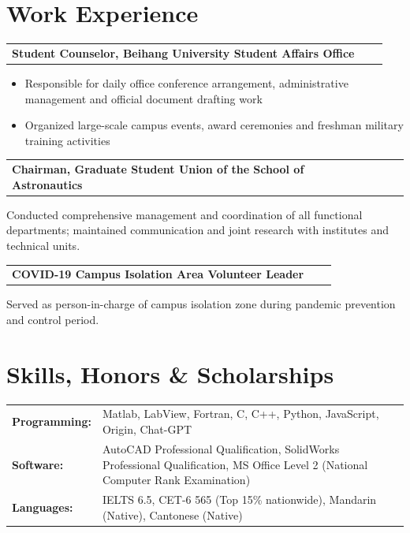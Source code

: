 \documentclass[a4paper,12pt]{article}
\makeatletter
\newenvironment{jobshort}[2]
    {
    \begin{tabularx}{\linewidth}{@{}l X r@{}}
    \textbf{#1} & \hfill &  #2 \\[3.75pt]
    \end{tabularx}
    }
    {
    }
\newenvironment{joblong}[2]
    {
    \begin{tabularx}{\linewidth}{@{}l X r@{}}
    \textbf{#1} & \hfill &  #2 \\[3.75pt]
    \end{tabularx}
    \begin{minipage}[t]{\linewidth}
    \begin{itemize}[nosep,after=\strut, leftmargin=1em, itemsep=3pt,label=--]
    }
    {
    \end{itemize}
    \end{minipage}    
    }
\makeatother
\begin{document}











\section{\textbf{Work Experience}}

\begin{joblong}{Student Counselor, Beihang University Student Affairs Office}{}
\item Responsible for daily office conference arrangement, administrative management and official document drafting work
\item Organized large-scale campus events, award ceremonies and freshman military training activities
\end{joblong}

\begin{jobshort}{Chairman, Graduate Student Union of the School of Astronautics}{}
Conducted comprehensive management and coordination of all functional departments; maintained communication and joint research with institutes and technical units.
\end{jobshort}

\begin{jobshort}{COVID-19 Campus Isolation Area Volunteer Leader}{}
Served as person-in-charge of campus isolation zone during pandemic prevention and control period.
\end{jobshort}


\section{\textbf{Skills, Honors \& Scholarships}}
\begin{tabularx}{\linewidth}{@{}l X@{}}
\textbf{Programming:} & Matlab, LabView, Fortran, C, C++, Python, JavaScript, Origin, Chat-GPT \\
\textbf{Software:} & AutoCAD Professional Qualification, SolidWorks Professional Qualification, MS Office Level 2 (National Computer Rank Examination)\\
\textbf{Languages:} & IELTS 6.5, CET-6 565 (Top 15\% nationwide), Mandarin (Native), Cantonese (Native)\\
\end{tabularx}
\end{document}
